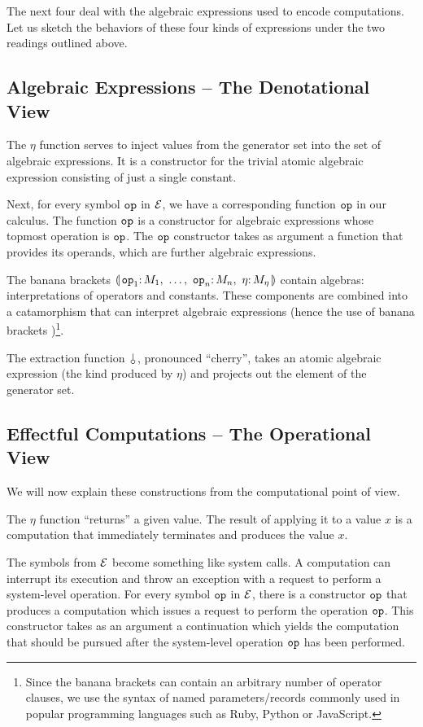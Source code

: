 The next four deal with the algebraic expressions used to encode
computations. Let us sketch the behaviors of these four kinds of
expressions under the two readings outlined above.

\subsection*{Algebraic Expressions -- The Denotational View}

The $\eta$ function serves to inject values from the generator set into the
set of algebraic expressions. It is a constructor for the trivial atomic
algebraic expression consisting of just a single constant.

Next, for every symbol $\mathtt{op}$ in $\mathcal{E}$, we have a corresponding function
$\mathtt{op}$ in our calculus. The function $\mathtt{op}$ is a constructor for
algebraic expressions whose topmost operation is $\mathtt{op}$. The $\mathtt{op}$
constructor takes as argument a function that provides its operands, which
are further algebraic expressions.

The banana brackets $\cdbanana$ contain algebras: interpretations of
operators and constants. These components are combined into a catamorphism
that can interpret algebraic expressions (hence the use of banana brackets
\cite{meijer1991functional})\footnote{Since the banana brackets can contain
  an arbitrary number of operator clauses, we use the syntax of named
  parameters/records commonly used in popular programming languages such as
  Ruby, Python or JavaScript.}.

The extraction function $\cherry$, pronounced ``cherry'', takes an atomic
algebraic expression (the kind produced by $\eta$) and projects out the
element of the generator set.

\subsection*{Effectful Computations -- The Operational View}

We will now explain these constructions from the computational point of
view.

The $\eta$ function ``returns'' a given value. The result of applying it to
a value $x$ is a computation that immediately terminates and produces the
value $x$.

The symbols from $\mathcal{E}$ become something like system calls. A computation
can interrupt its execution and throw an exception with a request to
perform a system-level operation. For every symbol $\mathtt{op}$ in $\mathcal{E}$,
there is a constructor $\mathtt{op}$ that produces a computation which issues a
request to perform the operation $\mathtt{op}$. This constructor takes as an
argument a continuation which yields the computation that should be pursued
after the system-level operation $\mathtt{op}$ has been performed.


